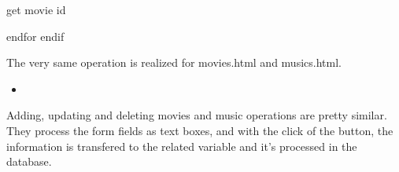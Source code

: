 \documentclass[letterpaper,10pt,english]{sphinxmanual}
\begin{document}
\begin{sphinxVerbatim}[commandchars=\\\{\}]
            

                \PYGZob{}\PYGZsh{} get movie id\PYGZsh{}\PYGZcb{}

                      
                      
                      
                     

     \PYGZob{}\PYGZpc{} endfor \PYGZpc{}\PYGZcb{}
       \PYGZob{}\PYGZpc{} endif \PYGZpc{}\PYGZcb{}
\end{sphinxVerbatim}

The very same operation is realized for movies.html and musics.html.
\begin{itemize}
\item {} 

\end{itemize}

Adding, updating and deleting movies and music operations are pretty similar.
They process the form fields as text boxes, and with the click of the button,
the information is transfered to the related variable and it’s processed in the database.
\end{document}
